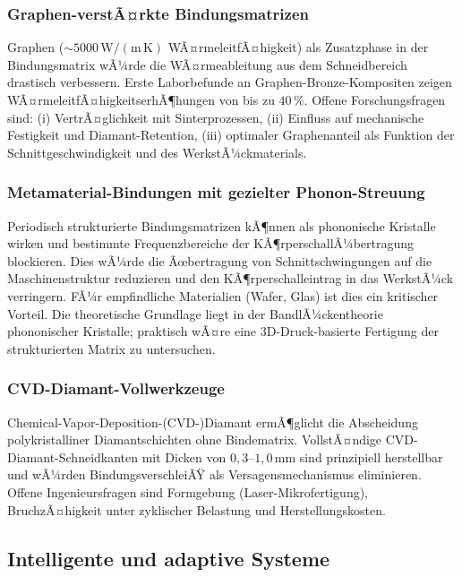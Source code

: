 ﻿\documentclass[a4paper,12pt]{article}
\theoremstyle{definition}
\begin{document}
\subsubsection{Graphen-verstÃ¤rkte Bindungsmatrizen}

Graphen ($\sim 5000\,\mathrm{W/(m\,K)}$ WÃ¤rmeleitfÃ¤higkeit) als Zusatzphase in der
Bindungsmatrix wÃ¼rde die WÃ¤rmeableitung aus dem Schneidbereich drastisch verbessern.
Erste Laborbefunde an Graphen-Bronze-Kompositen zeigen WÃ¤rmeleitfÃ¤higkeitserhÃ¶hungen
von bis zu $40\,\%$. Offene Forschungsfragen sind: (i) VertrÃ¤glichkeit mit Sinterprozessen,
(ii) Einfluss auf mechanische Festigkeit und Diamant-Retention, (iii) optimaler
Graphenanteil als Funktion der Schnittgeschwindigkeit und des WerkstÃ¼ckmaterials.

\subsubsection{Metamaterial-Bindungen mit gezielter Phonon-Streuung}

Periodisch strukturierte Bindungsmatrizen kÃ¶nnen als phononische Kristalle wirken
und bestimmte Frequenzbereiche der KÃ¶rperschallÃ¼bertragung blockieren. Dies wÃ¼rde
die Ãœbertragung von Schnittschwingungen auf die Maschinenstruktur reduzieren und
den KÃ¶rperschalleintrag in das WerkstÃ¼ck verringern. FÃ¼r empfindliche Materialien
(Wafer, Glas) ist dies ein kritischer Vorteil. Die theoretische Grundlage liegt in
der BandlÃ¼ckentheorie phononischer Kristalle; praktisch wÃ¤re eine 3D-Druck-basierte
Fertigung der strukturierten Matrix zu untersuchen.

\subsubsection{CVD-Diamant-Vollwerkzeuge}

Chemical-Vapor-Deposition-(CVD-)Diamant ermÃ¶glicht die Abscheidung polykristalliner
Diamantschichten ohne Bindematrix. VollstÃ¤ndige CVD-Diamant-Schneidkanten mit Dicken
von $0{,}3$--$1{,}0\,\mathrm{mm}$ sind prinzipiell herstellbar und wÃ¼rden
BindungsverschleiÃŸ als Versagensmechanismus eliminieren. Offene Ingenieursfragen
sind Formgebung (Laser-Mikrofertigung), BruchzÃ¤higkeit unter zyklischer Belastung
und Herstellungskosten.

\subsection{Intelligente und adaptive Systeme}
\end{document}
